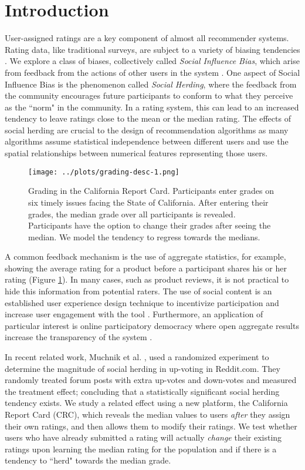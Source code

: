\section{Introduction}
User-assigned ratings are a key component of almost all recommender systems.
Rating data, like traditional surveys, are subject to a variety of biasing tendencies \cite{groves2013survey}.
We explore a class of biases, collectively called \emph{Social Influence Bias}, which arise from feedback from the actions of other users in the system \cite{demarzo2003persuasion, moscovici1972social, wood2000attitude}.
One aspect of Social Influence Bias is the phenomenon called \emph{Social Herding}, where the feedback from the community encourages future participants to conform to what they perceive as the ``norm" in the community. 
In a rating system, this can lead to an increased tendency to leave ratings close to the mean or the median rating. 
The effects of social herding are crucial to the design of recommendation algorithms as many algorithms assume statistical independence between different users and use the spatial relationships between numerical features representing those users.

\begin{figure}[h]
  \centering
    \texttt{[image: ../plots/grading-desc-1.png]}
      \caption{Grading in the California Report Card. Participants enter grades on six timely issues facing the State of California. After entering their grades, the median grade over all participants is revealed. Participants have the option to change their grades after seeing the median. We model the tendency to regress towards the medians.}
      \label{grading-1}
\end{figure}

A common feedback mechanism is the use of aggregate statistics, for example, showing the average rating for a product before a participant shares his or her rating (Figure \ref{grading-1}).
In many cases, such as product reviews, it is not practical to hide this information from potential raters.
The use of social content is an established user experience design technique to incentivize participation and increase user engagement with the tool \cite{shneiderman1992designing}.
Furthermore, an application of particular interest is online participatory democracy where open aggregate results increase the transparency of the system \cite{albors2008new,o2012transparency,noveck2008wiki}.

In recent related work, Muchnik et al. \cite{muchnik2013social}, used a randomized experiment to determine the magnitude of social herding in up-voting in Reddit.com.
They randomly treated forum posts with extra up-votes and down-votes and measured the treatment effect; concluding that a statistically significant social herding tendency exists.
We study a related effect using a new platform, the California Report Card (CRC), which reveals the median values to users \emph{after} they assign their own ratings, and then allows them to modify their ratings.
We test whether users who have already submitted a rating will actually \emph{change} their existing ratings upon learning the median rating for the population and if there is a tendency to ``herd" towards the median grade.

